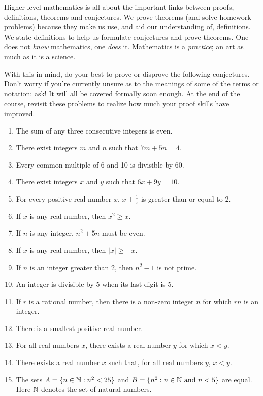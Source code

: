 \goodbreak




Higher-level mathematics is all about the important links between proofs, definitions, theorems and conjectures. We prove theorems (and solve homework problems) because they make us use, and aid our understanding of, definitions. We state definitions to help us formulate conjectures and prove theorems. One does not \emph{know} mathematics, one \emph{does} it. Mathematics is a \emph{practice}; an art as much as it is a science.\medbreak

With this in mind, do your best to prove or disprove the following conjectures. Don't worry if you're currently unsure as to the meanings of some of the terms or notation: ask! It will all be covered formally soon enough. At the end of the course, revisit these problems to realize how much your proof skills have improved. 

\begin{enumerate}
	\item The sum of any three consecutive integers is even.
	\item There exist integers $m$ and $n$ such that $7m+5n =4$.
	\item Every common multiple of 6 and 10 is divisible by 60.
	\item There exist integers $x$ and $y$ such that $6x+9y =10$.
	\item For every positive real number $x$, $x+\frac{1}{x} $ is greater than or equal to 2.
	\item If $x$ is any real number, then $x^2\ge x$.
	\item If $n$ is any integer, $n^2+5n$ must be even.
	\item If $x$ is any real number, then $|x|\ge -x$.
	\item If $n$ is an integer greater than 2, then $n^2-1$ is not prime.
	\item An integer is divisible by 5 when its last digit is 5.
	\item If $r$ is a rational number, then there is a non-zero integer $n$ for which $rn$ is an integer.
	\item There is a smallest positive real number.
	\item For all real numbers $x$, there exists a real number $y$ for which $x<y$.
	\item There exists a real number $x$ such that, for all real numbers $y$, $x<y$.
	\item The sets $A=\{n\in\mathbb{N}:n^2<25\}$ and $B=\{n^2:n\in\mathbb{N}\text{ and }n<5\}$ are equal. Here $\mathbb{N}$ denotes the set of natural numbers.
\end{enumerate}



